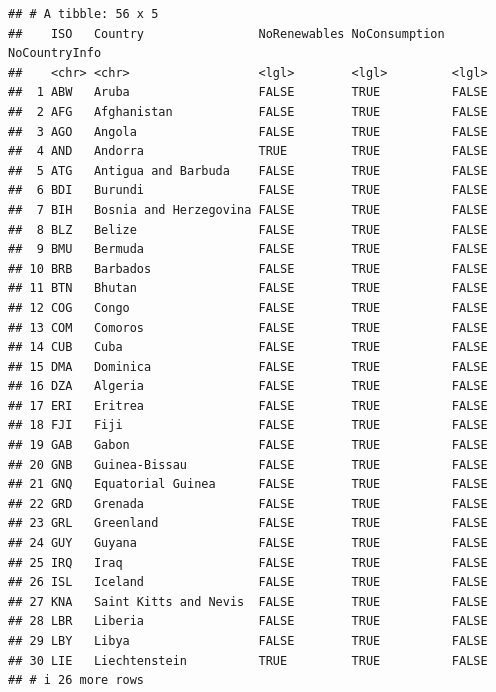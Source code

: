 \documentclass[
]{article}
\begin{document}
\begin{verbatim}
## # A tibble: 56 x 5
##    ISO   Country                NoRenewables NoConsumption NoCountryInfo
##    <chr> <chr>                  <lgl>        <lgl>         <lgl>        
##  1 ABW   Aruba                  FALSE        TRUE          FALSE        
##  2 AFG   Afghanistan            FALSE        TRUE          FALSE        
##  3 AGO   Angola                 FALSE        TRUE          FALSE        
##  4 AND   Andorra                TRUE         TRUE          FALSE        
##  5 ATG   Antigua and Barbuda    FALSE        TRUE          FALSE        
##  6 BDI   Burundi                FALSE        TRUE          FALSE        
##  7 BIH   Bosnia and Herzegovina FALSE        TRUE          FALSE        
##  8 BLZ   Belize                 FALSE        TRUE          FALSE        
##  9 BMU   Bermuda                FALSE        TRUE          FALSE        
## 10 BRB   Barbados               FALSE        TRUE          FALSE        
## 11 BTN   Bhutan                 FALSE        TRUE          FALSE        
## 12 COG   Congo                  FALSE        TRUE          FALSE        
## 13 COM   Comoros                FALSE        TRUE          FALSE        
## 14 CUB   Cuba                   FALSE        TRUE          FALSE        
## 15 DMA   Dominica               FALSE        TRUE          FALSE        
## 16 DZA   Algeria                FALSE        TRUE          FALSE        
## 17 ERI   Eritrea                FALSE        TRUE          FALSE        
## 18 FJI   Fiji                   FALSE        TRUE          FALSE        
## 19 GAB   Gabon                  FALSE        TRUE          FALSE        
## 20 GNB   Guinea-Bissau          FALSE        TRUE          FALSE        
## 21 GNQ   Equatorial Guinea      FALSE        TRUE          FALSE        
## 22 GRD   Grenada                FALSE        TRUE          FALSE        
## 23 GRL   Greenland              FALSE        TRUE          FALSE        
## 24 GUY   Guyana                 FALSE        TRUE          FALSE        
## 25 IRQ   Iraq                   FALSE        TRUE          FALSE        
## 26 ISL   Iceland                FALSE        TRUE          FALSE        
## 27 KNA   Saint Kitts and Nevis  FALSE        TRUE          FALSE        
## 28 LBR   Liberia                FALSE        TRUE          FALSE        
## 29 LBY   Libya                  FALSE        TRUE          FALSE        
## 30 LIE   Liechtenstein          TRUE         TRUE          FALSE        
## # i 26 more rows
\end{verbatim}
\end{document}
